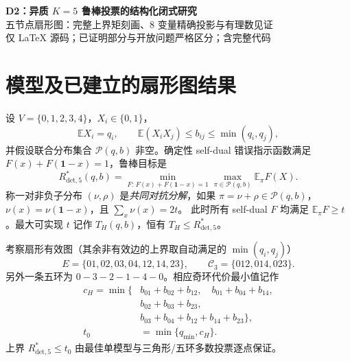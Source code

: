 \documentclass[11pt,a4paper]{ctexart}
\theoremstyle{remark}\newtheorem{remark}[theorem]{说明}
\newcommand{\Rdet}{R^*_{\mathrm{det},5}}
\newcommand{\Tc}{T_H}
\newcommand{\bx}{\boldsymbol 1}
\newcommand{\EE}{\mathbb E}
\begin{document}
\begin{center}
{\LARGE\bfseries D2：异质 $K=5$ 鲁棒投票的结构化闭式研究}\\[5pt]
{\large 五节点扇形图：完整上界矩刻画、8 变量精确投影与有理数见证}\\[5pt]
{\small 仅 LaTeX 源码；已证明部分与开放问题严格区分；含完整代码}
\end{center}
\begin{abstract}
考虑五个二元分类器的错误指标 $X_i$，已知边际 $0<q_i<1/2$ 和成对共同出错概率上界 $b_{ij}$，寻求未知依赖结构下的确定性 self-dual minimax 投票。
聚焦此前未完全解决的七边扇形有效图
$E=\{01,02,03,04,12,14,23\}$。
保留先前已证的“9 个奇环覆盖极点及条件性闭式”，本轮主要给出两项进一步的\emph{精确解析}结果：
(1) 以共享边的两项交集概率为消元变量，给出扇形图\emph{任意质量、任意异质边际及成对上界}的完整概率可行性充要判据；
(2) 结合 clique-tree 拼接，将最大互补对称对抗质量从原始 48 变量或此前 18 变量 LP 精确压缩至\emph{仅 8 个连续变量}，全部约束为显式线性不等式。
此外用纯有理数、直接构造 32 状态联合分布，证明旧闭式的三角形边际附加条件并非必要：某个严格位于高精度区域 $R\setminus R_0$ 的异质实例，虽然该条件严重不满足，仍有匹配的确定性 minimax 值。
\textbf{局限：} 8 变量 LP 求得的是共同对抗分布值 $T_H$；在全扇形图参数域证明 $T_H=\Rdet$ 及无优化闭式，仍是未解决问题。
\end{abstract}

\section{模型及已建立的扇形图结果}
\label{sec:model}
设 $V=\{0,1,2,3,4\}$，$X_i\in\{0,1\}$，
\[
\EE X_i=q_i,\qquad \EE(X_iX_j)\le b_{ij}\le\min(q_i,q_j),
\]
并假设联合分布集合 $\mathcal P(q,b)$ 非空。确定性 self-dual 错误指示函数满足
$F(x)+F(\bx-x)=1$，鲁棒目标是
\[
\Rdet(q,b)=\min_{F:\,F(x)+F(\bx-x)=1}
\max_{\pi\in\mathcal P(q,b)}\EE_\pi F(X).
\]
称一对非负子分布 $(\nu,\rho)$ 是\emph{共同对抗分解}，如果
$\pi=\nu+\rho\in\mathcal P(q,b)$，
$\nu(x)=\nu(\bx-x)$，且 $\sum_x\nu(x)=2t$。
此时所有 self-dual $F$ 均满足 $\EE_\pi F\ge t$。最大可实现 $t$ 记作 $\Tc(q,b)$，恒有 $\Tc\le\Rdet$。

考察扇形有效图（其余非有效边的上界取自动满足的 $\min(q_i,q_j)$）
\begin{equation}\label{eq:fan}
E=\{01,02,03,04,12,14,23\},\qquad
\mathcal C_3=\{012,014,023\}.
\end{equation}
另外一条五环为 $0-3-2-1-4-0$。相应奇环代价最小值记作
\begin{equation}\label{eq:cH}
\begin{split}
c_H=\min\{&b_{01}+b_{02}+b_{12},\quad b_{01}+b_{04}+b_{14},\\
&b_{02}+b_{03}+b_{23},\\
&b_{03}+b_{04}+b_{12}+b_{14}+b_{23}\},\\
t_0&=\min\{q_{\min},c_H\}.
\end{split}
\end{equation}
上界 $\Rdet\le t_0$ 由最佳单模型与三角形/五环多数投票逐点保证。
\end{document}
